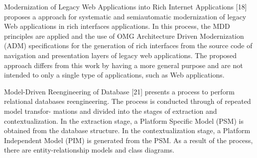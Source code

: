  Modernization of Legacy Web Applications into Rich Internet Applications [18] proposes a approach for systematic and semiautomatic modernization of legacy Web applications in rich interfaces applications. In this process, the MDD principles are applied and the use of OMG Architecture Driven Modernization (ADM) specifications for the generation of rich interfaces from the source code of navigation and presentation layers of legacy web applications. The proposed approach differs from this work by having a more general purpose and are not intended to only a single type of applications, such as Web applications.


Model-Driven Reengineering of Database [21] presents a process to perform relational databases reengineering. The process is conducted through of repeated model transfor- mations and divided into the stages of extraction and contextualization. In the extraction stage, a Platform Specific Model (PSM) is obtained from the database structure. In the contextualization stage, a Platform Independent Model (PIM) is generated from the PSM. As a result of the process, there are entity-relationship models and class diagrams.